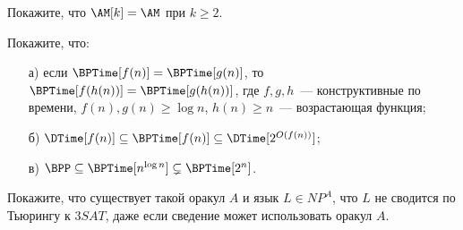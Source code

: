 

\begin{task}
    Покажите, что $\AM[k] = \AM$ при $k \ge 2$.
\end{task}


\begin{task}
    Покажите, что:
	\begin{enumerate}[topsep = 0pt, itemsep = -1ex]
        \item [а)] если $\BPTime[f(n)] = \BPTime[g(n)]$, то $\BPTime[f(h(n))] = \BPTime[g(h(n))]$, где $f, g, h$~---
			конструктивные по времени, $f(n), g(n) \ge \log n$, $h(n) \ge n$~--- возрастающая функция;
        \item [б)] $\DTime[f(n)] \subseteq \BPTime[f(n)] \subseteq \DTime[2^{O(f(n))}]$;
        \item [в)] $\BPP \subseteq \BPTime[n^{\log n}] \subsetneq \BPTime[2^n]$.
    \end{enumerate}    
\end{task}


\begin{task}
    Покажите, что существует такой оракул $A$ и язык $L \in NP^A$, что $L$ не сводится по Тьюрингу к $3SAT$, даже если сведение
    может использовать оракул $A$.
\end{task}